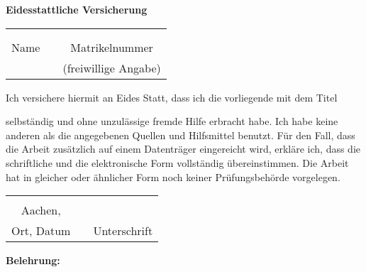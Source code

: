 \pagestyle{empty}
\enlargethispage{3cm}
{

%
	
\begin{center}
	\textbf{Eidesstattliche Versicherung}
\end{center}
\begin{tabular}{cp{5.2cm}c}
\hspace{5cm}	& & \hspace{4cm} \\ 
\IASAuthor 		& & \IASMatNr \\\cline{1-1} \cline{3-3}
Name   & & Matrikelnummer \\
				& &(freiwillige Angabe) \\
\end{tabular}
\par
Ich versichere hiermit an Eides Statt, \hfill \newline 
dass ich die vorliegende \IASSubject \- mit dem Titel \hfill 
\par
\ThesisTitleGerman 
\par
\ThesisTitleEnglish 
\par
selbständig und ohne unzulässige fremde Hilfe erbracht habe. Ich habe keine anderen als die angegebenen Quellen und Hilfsmittel benutzt. Für den Fall, dass die Arbeit zusätzlich auf einem Datenträger eingereicht wird, erkläre ich, dass die schriftliche und die elektronische Form vollständig übereinstimmen. Die Arbeit hat in gleicher oder ähnlicher Form noch keiner 
Prüfungsbehörde vorgelegen.
\par
\begin{tabular}{cp{5.2cm}c}
	\hspace{5cm}				& & \hspace{4cm} 	\\ 
	Aachen, \IASSubmissionDate 	& &   				\\ \cline{1-1} \cline{3-3} 
	Ort, Datum     				& & Unterschrift 	\\
\end{tabular}
\par 
\vspace*{\fill} 
\par
\textbf{Belehrung:} 

}
